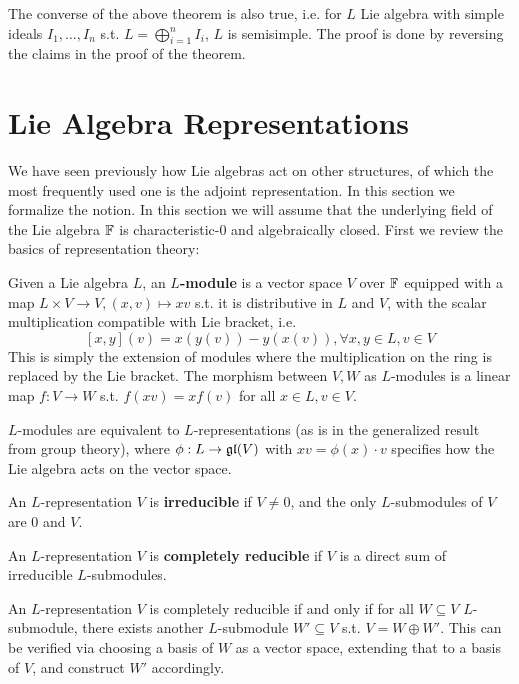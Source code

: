 \documentclass{article}
\begin{document}
\begin{corollary}
    The converse of the above theorem is also true, i.e. for $L$ Lie algebra with simple ideals $I_1, \dots, I_n$ s.t. $L = \bigoplus_{i = 1}^n I_i$, $L$ is semisimple. The proof is done by reversing the claims in the proof of the theorem.
\end{corollary}

\section{Lie Algebra Representations}

\textstart
We have seen previously how Lie algebras act on other structures, of which the most frequently used one is the adjoint representation. In this section we formalize the notion. In this section we will assume that the underlying field of the Lie algebra $\mathbb{F}$ is characteristic-0 and algebraically closed. First we review the basics of representation theory:

\begin{definition}
    Given a Lie algebra $L$, an \textbf{$L$-module} is a vector space $V$ over $\mathbb{F}$ equipped with a map $L \times V \to V, (x, v) \mapsto xv$ s.t. it is distributive in $L$ and $V$, with the scalar multiplication compatible with Lie bracket, i.e.
    \[
        [x, y](v) = x(y(v)) - y(x(v)), \forall x, y \in L, v \in V
    \]
    This is simply the extension of modules where the multiplication on the ring is replaced by the Lie bracket. The morphism between $V, W$ as $L$-modules is a linear map $f: V \to W$ s.t. $f(xv) = xf(v)$ for all $x \in L, v \in V$.
\end{definition}
\nogap
\begin{remark}
    $L$-modules are equivalent to $L$-representations (as is in the generalized result from group theory), where $\phi: L \to \mathfrak{gl}(V)$ with $xv = \phi(x) \cdot v$ specifies how the Lie algebra acts on the vector space.
\end{remark}

\begin{definition}[Irreducible]
    An $L$-representation $V$ is \textbf{irreducible} if $V \neq 0$, and the only $L$-submodules of $V$ are 0 and $V$.
\end{definition}
\nogap
\begin{definition}\label{def: completely reducible}
    An $L$-representation $V$ is \textbf{completely reducible} if $V$ is a direct sum of irreducible $L$-submodules.
\end{definition}
\nogap
\begin{remark}
    An $L$-representation $V$ is completely reducible if and only if for all $W \subseteq V$ $L$-submodule, there exists another $L$-submodule $W' \subseteq V$ s.t. $V = W \oplus W'$. This can be verified via choosing a basis of $W$ as a vector space, extending that to a basis of $V$, and construct $W'$ accordingly. 
\end{remark}
\end{document}
